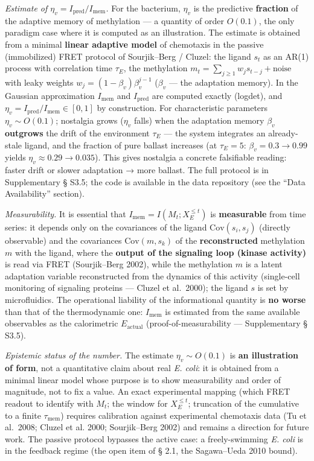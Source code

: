 \documentclass[pdflatex,sn-mathphys-ay]{sn-jnl}
\begin{document}
\emph{Estimate of \(\eta_v = I_{\text{pred}}/I_{\text{mem}}\).} For the bacterium, \(\eta_v\) is the predictive \textbf{fraction} of the adaptive memory of methylation --- a quantity of order \(O(0.1)\), the only paradigm case where it is computed as an illustration. The estimate is obtained from a minimal \textbf{linear adaptive model} of chemotaxis in the passive (immobilized) FRET protocol of Sourjik--Berg / Cluzel: the ligand \(s_t\) as an AR(1) process with correlation time \(\tau_E\), the methylation \(m_t = \sum_{j \ge 1} w_j s_{t-j} + \text{noise}\) with leaky weights \(w_j = (1-\beta_v)\beta_v^{j-1}\) (\(\beta_v\) --- the adaptation memory). In the Gaussian approximation \(I_{\text{mem}}\) and \(I_{\text{pred}}\) are computed exactly (logdet), and \(\eta_v = I_{\text{pred}}/I_{\text{mem}} \in [0, 1]\) by construction. For characteristic parameters \(\eta_v \sim O(0.1)\); nostalgia grows (\(\eta_v\) falls) when the adaptation memory \(\beta_v\) \textbf{outgrows} the drift of the environment \(\tau_E\) --- the system integrates an already-stale ligand, and the fraction of pure ballast increases (at \(\tau_E = 5\): \(\beta_v = 0.3 \to 0.99\) yields \(\eta_v \approx 0.29 \to 0.035\)). This gives nostalgia a concrete falsifiable reading: faster drift or slower adaptation → more ballast. The full protocol is in Supplementary § S3.5; the code is available in the data repository (see the ``Data Availability'' section).

\emph{Measurability.} It is essential that \(I_{\text{mem}} = I(M_t; X_E^{\le t})\) is \textbf{measurable} from time series: it depends only on the covariances of the ligand \(\text{Cov}(s_i, s_j)\) (directly observable) and the covariances \(\text{Cov}(m, s_k)\) of the \textbf{reconstructed} methylation \(m\) with the ligand, where the \textbf{output of the signaling loop (kinase activity)} is read via FRET (Sourjik--Berg 2002), while the methylation \(m\) is a latent adaptation variable reconstructed from the dynamics of this activity (single-cell monitoring of signaling proteins --- Cluzel et al.~2000); the ligand \(s\) is set by microfluidics. The operational liability of the informational quantity is \textbf{no worse} than that of the thermodynamic one: \(I_{\text{mem}}\) is estimated from the same available observables as the calorimetric \(E_{\text{actual}}\) (proof-of-measurability --- Supplementary § S3.5).

\emph{Epistemic status of the number.} The estimate \(\eta_v \sim O(0.1)\) is \textbf{an illustration of form}, not a quantitative claim about real \emph{E. coli}: it is obtained from a minimal linear model whose purpose is to show measurability and order of magnitude, not to fix a value. An exact experimental mapping (which FRET readout to identify with \(M_t\); the window for \(X_E^{\le t}\); truncation of the cumulative to a finite \(\tau_{\text{mem}}\)) requires calibration against experimental chemotaxis data (Tu et al.~2008; Cluzel et al. 2000; Sourjik--Berg 2002) and remains a direction for future work. The passive protocol bypasses the active case: a freely-swimming \emph{E. coli} is in the feedback regime (the open item of § 2.1, the Sagawa--Ueda 2010 bound).
\end{document}
